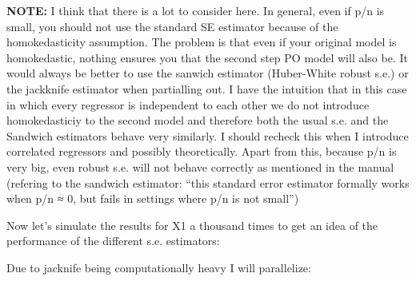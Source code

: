 \documentclass[
]{article}
\begin{document}
\textbf{NOTE:} I think that there is a lot to consider here. In general,
even if p/n is small, you should not use the standard SE estimator
because of the homokedasticity assumption. The problem is that even if
your original model is homokedastic, nothing ensures you that the second
step PO model will also be. It would always be better to use the sanwich
estimator (Huber-White robust s.e.) or the jackknife estimator when
partialling out. I have the intuition that in this case in which every
regressor is independent to each other we do not introduce
homokedasticiy to the second model and therefore both the usual s.e. and
the Sandwich estimators behave very similarly. I should recheck this
when I introduce correlated regressors and possibly theoretically. Apart
from this, because p/n is very big, even robust s.e. will not behave
correctly as mentioned in the manual (refering to the sandwich
estimator: ``this standard error estimator formally works when p/n ≈ 0,
but fails in settings where p/n is not small'')

Now let's simulate the results for X1 a thousand times to get an idea of
the performance of the different s.e. estimators:

Due to jacknife being computationally heavy I will parallelize:
\end{document}

